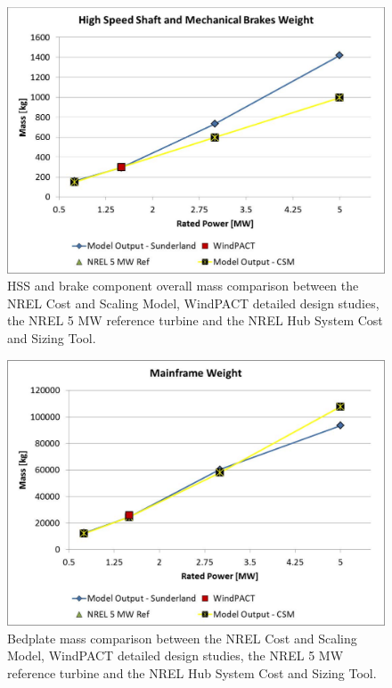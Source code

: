\documentclass[letterpaper,10pt,openany,oneside]{sphinxmanual}
\begin{document}
\begin{figure}[htbp]
\centering
\capstart

\includegraphics[width=6.5in]{hssmass.pdf}
\caption{HSS and brake component overall mass comparison between the NREL Cost and Scaling Model, WindPACT detailed design studies, the NREL 5 MW reference turbine and the NREL Hub System Cost and Sizing Tool.}\label{theory:hssmass}\end{figure}
\begin{figure}[htbp]
\centering
\capstart

\includegraphics[width=6.5in]{bedplatemass.pdf}
\caption{Bedplate mass comparison between the NREL Cost and Scaling Model, WindPACT detailed design studies, the NREL 5 MW reference turbine and the NREL Hub System Cost and Sizing Tool.}\label{theory:bedplatemass}\end{figure}
\end{document}
